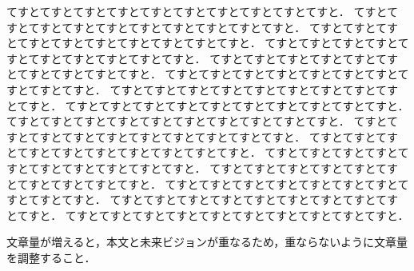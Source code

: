 \documentclass[twoside]{wiss}
\begin{document}
てすとてすとてすとてすとてすとてすとてすとてすとてすとてすと．
てすとてすとてすとてすとてすとてすとてすとてすとてすとてすと．
てすとてすとてすとてすとてすとてすとてすとてすとてすとてすと．
てすとてすとてすとてすとてすとてすとてすとてすとてすとてすと．
てすとてすとてすとてすとてすとてすとてすとてすとてすとてすと．
てすとてすとてすとてすとてすとてすとてすとてすとてすとてすと．
てすとてすとてすとてすとてすとてすとてすとてすとてすとてすと．
てすとてすとてすとてすとてすとてすとてすとてすとてすとてすと．
てすとてすとてすとてすとてすとてすとてすとてすとてすとてすと．
てすとてすとてすとてすとてすとてすとてすとてすとてすとてすと．
てすとてすとてすとてすとてすとてすとてすとてすとてすとてすと．
てすとてすとてすとてすとてすとてすとてすとてすとてすとてすと．
てすとてすとてすとてすとてすとてすとてすとてすとてすとてすと．
てすとてすとてすとてすとてすとてすとてすとてすとてすとてすと．
てすとてすとてすとてすとてすとてすとてすとてすとてすとてすと．
てすとてすとてすとてすとてすとてすとてすとてすとてすとてすと．


文章量が増えると，本文と未来ビジョンが重なるため，重ならないように文章量を調整すること．

\balance %





\end{document}
